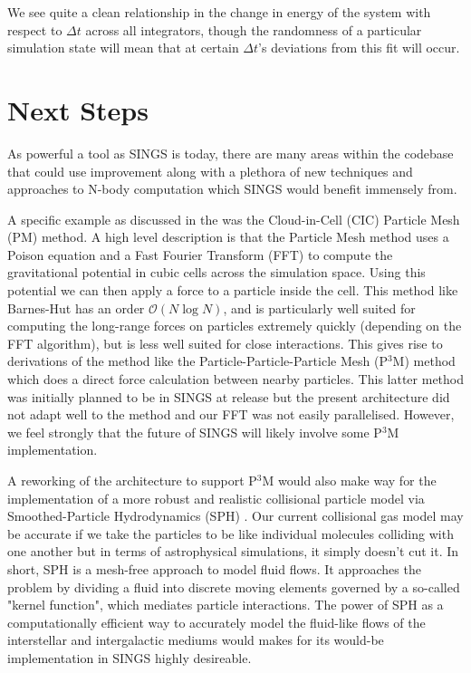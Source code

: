 \documentclass[12pt, twoside, letterpaper]{article}
\begin{document}
We see quite a clean relationship in the change in energy of the system with respect to $\Delta t$ across all integrators, though the randomness of a particular simulation state will mean that at certain $\Delta t$'s deviations from this fit will occur. 

\section{Next Steps} \label{sec:nextsteps}
As powerful a tool as SINGS is today, there are many areas within the codebase that could use improvement along with a plethora of new techniques and approaches to N-body computation which SINGS would benefit immensely from.

A specific example as discussed in the  was the Cloud-in-Cell (CIC) Particle Mesh (PM) method. A high level description is that the Particle Mesh method uses a Poison equation and a Fast Fourier Transform (FFT) to compute the gravitational potential in cubic cells across the simulation space. Using this potential we can then apply a  force to a particle inside the cell. This method like Barnes-Hut has an order $\mathcal{O}(N \log N)$, and is particularly well suited for computing the long-range forces on particles extremely quickly (depending on the FFT algorithm), but is less well suited for close interactions. This gives rise to derivations of the method like the Particle-Particle-Particle Mesh (P$^3$M) method \citep{hockney1988particle} which does a direct force calculation between nearby particles. This latter method was initially planned to be in SINGS at release but the present architecture did not adapt well to the method and our FFT was not easily parallelised. However, we feel strongly that the future of SINGS will likely involve some P$^3$M implementation.

A reworking of the architecture to support P$^3$M would also make way for the implementation of a more robust and realistic collisional particle model via Smoothed-Particle Hydrodynamics (SPH) \citep{gingold1977smoothed}. Our current collisional gas model may be accurate if we take the particles to be like individual molecules colliding with one another but in terms of astrophysical simulations, it simply doesn't cut it. In short, SPH is a mesh-free approach to model fluid flows. It approaches the problem by dividing a fluid into discrete moving elements governed by a so-called "kernel function", which mediates particle interactions. The power of SPH as a computationally efficient way to accurately model the fluid-like flows of the interstellar and intergalactic mediums would makes for its would-be implementation in SINGS highly desireable. 
\end{document}
